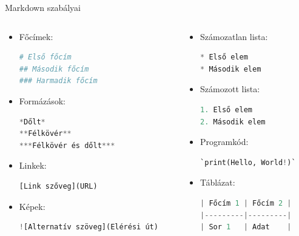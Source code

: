\documentclass[english, aspectratio=169]{beamer}
\begin{document}
\begin{frame}[fragile]{Markdown szabályai}
	\begin{columns}
		\begin{column}{.5\textwidth}
			\begin{itemize}
				\item Főcímek:
				\begin{lstlisting}[language=python]
# Első főcím
## Második főcím
### Harmadik főcím
				\end{lstlisting}
				\item Formázások:
				\begin{lstlisting}[language=python]
*Dőlt*
**Félkövér**
***Félkövér és dőlt***
				\end{lstlisting}
				\item Linkek:
				\begin{lstlisting}[language=python]
[Link szőveg](URL)
				\end{lstlisting}
				\item Képek:
				\begin{lstlisting}[language=python]
![Alternatív szöveg](Elérési út)
				\end{lstlisting}
			\end{itemize}
		\end{column}
		\begin{column}{.5\textwidth}
			\begin{itemize}
				\item Számozatlan lista:
				\begin{lstlisting}[language=python]
* Első elem
* Második elem
				\end{lstlisting}
				\item Számozott lista: 
				\begin{lstlisting}[language=python]
1. Első elem
2. Második elem
				\end{lstlisting}
				\item Programkód:
				\begin{lstlisting}[language=python]
`print(Hello, World!)`
				\end{lstlisting}
				\item Táblázat:
				\begin{lstlisting}[language=python]
| Főcím 1 | Főcím 2 |
|---------|---------|
| Sor 1   | Adat    |
				\end{lstlisting}
			\end{itemize}
		\end{column}
	\end{columns}
\end{frame}
\end{document}
